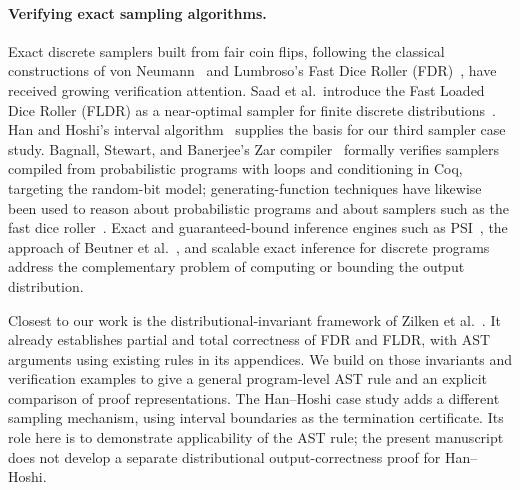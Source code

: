 \paragraph{Verifying exact sampling algorithms.}
Exact discrete samplers built from fair coin flips, following the classical constructions of von Neumann~\cite{vonNeumann1951} and Lumbroso's Fast Dice Roller (FDR)~\cite{DBLP:journals/corr/abs-1304-1916}, have received growing verification attention. Saad et al.\ introduce the Fast Loaded Dice Roller (FLDR) as a near-optimal sampler for finite discrete distributions~\cite{DBLP:conf/aistats/SaadFRM20}. Han and Hoshi's interval algorithm~\cite{HanHoshi1997} supplies the basis for our third sampler case study. Bagnall, Stewart, and Banerjee's Zar compiler~\cite{DBLP:journals/pacmpl/Bagnall0023,10.1145/3591220} formally verifies samplers compiled from probabilistic programs with loops and conditioning in Coq, targeting the random-bit model; generating-function techniques have likewise been used to reason about probabilistic programs and about samplers such as the fast dice roller~\cite{DBLP:conf/lopstr/KlinkenbergBKKM20,DBLP:conf/cav/ChenKKW22,haase2026generatingfunctionsmeetoccupation}. Exact and guaranteed-bound inference engines such as PSI~\cite{DBLP:conf/cav/GehrMV16,DBLP:conf/pldi/GehrSV20}, the approach of Beutner et al.~\cite{DBLP:conf/pldi/BeutnerOZ22}, and scalable exact inference for discrete programs~\cite{DBLP:journals/pacmpl/HoltzenBM20} address the complementary problem of computing or bounding the output distribution.

Closest to our work is the distributional-invariant framework of Zilken et al.~\cite{zilken2026verifyingsamplingalgorithmsdistributional}. It already establishes partial and total correctness of FDR and FLDR, with AST arguments using existing rules in its appendices. We build on those invariants and verification examples to give a general program-level AST rule and an explicit comparison of proof representations. The Han--Hoshi case study adds a different sampling mechanism, using interval boundaries as the termination certificate. Its role here is to demonstrate applicability of the AST rule; the present manuscript does not develop a separate distributional output-correctness proof for Han--Hoshi.

